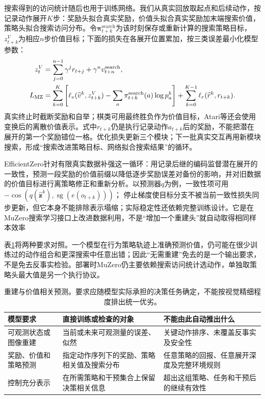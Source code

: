搜索得到的访问统计随后也用于训练网络。我们从真实回放取起点和后续动作，按记录动作展开$K$步：奖励头拟合真实奖励，价值头拟合真实奖励加末端搜索价值，策略头拟合搜索访问分布。令$\bm\pi^{\mathrm{search}}_{t+k}$为该时刻保存或重新计算的搜索策略目标，$z^V_{t+k}$为相应$n$步价值目标；下面的损失在各展开位置累加，按三类误差最小化模型参数：
\begin{align}
  z^V_t&=\sum_{j=0}^{n-1}\gamma^j r_{t+j}
                     +\gamma^n v^{\mathrm{search}}_{t+n}, \notag\\
  L_{\mathrm{MZ}}
    &=\sum_{k=0}^{K}
       \left[\ell_v(\widehat v^k,z^V_{t+k})
            -\sum_a\pi^{\mathrm{search}}_{t+k}(a)\log p^k_a\right]
      +\sum_{k=0}^{K-1}\ell_r(\widehat r^k,r_{t+k}).
  \label{eq:rl-learning-muzero-loss}
\end{align}
真实终止时截断奖励和自举；棋类可用最终胜负作为价值目标，Atari等还会使用变换后的离散价值表示。式中$r_{t+k}$仍是执行记录动作$a_{t+k}$后的奖励，不能把潜在展开的第一个奖励错位一格。优化损失更新三个模块；下一批真实交互再用新模块搜索，形成“搜索改进策略目标、网络拟合搜索结果”的循环。

EfficientZero针对有限真实数据补强这一循环：用记录后继的编码监督潜在展开的一致性，预测一段奖励的价值前缀以降低逐步奖励误差对备份的影响，并对旧数据的价值目标进行离策略修正和重新分析。以预测器$q$为例，一致性项可用
$-\operatorname{cos}(q(\widehat{\bm z}^{k}),\operatorname{sg}(e(o_{t+k})))$；
停止梯度使目标分支不被当前一致性损失同步更新，但它本身不能排除表示塌缩；实际稳定性还依赖完整训练设计。它是在MuZero搜索学习接口上改进数据利用，不是“增加一个重建头”就自动取得相同样本效率

表\ref{tab:rl-learning-model-requirements}将两种要求对照。一个模型在行为策略轨迹上准确预测价值，仍可能在很少训练过的动作组合和更深搜索中任意出错；因此“无需重建”免去的是一个输出要求，不是免去反事实检验。部署时MuZero仍主要依赖搜索访问统计选动作，单独取策略头最大值是另一个执行协议。

\begin{table}[t]
  \centering
  \small
  \begin{tabularx}{\linewidth}{>{\raggedright\arraybackslash}p{26mm} >{\raggedright\arraybackslash}X >{\raggedright\arraybackslash}X}
    \toprule
    模型要求 & 直接训练或检查的对象 & 不能由此自动推出什么 \\
    \midrule
    可观测状态或图像重建 & 当前或未来可观测量的误差、似然 & 关键动作排序、未覆盖反事实及安全性 \\
    奖励、价值和策略预测 & 指定动作序列下的奖励、策略相关值及搜索分布 & 任意策略的回报、任意展开深度及完整环境规则 \\
    控制充分表示 & 在所需策略和干预集合上保留决策相关信息 & 超出这组策略、任务和干预后的继续有效性 \\
    \bottomrule
  \end{tabularx}
  \caption{重建与价值相关预测。要求应随模型实际承担的决策任务确定，不能按视觉精细程度排出统一优劣。}
  \label{tab:rl-learning-model-requirements}
\end{table}

